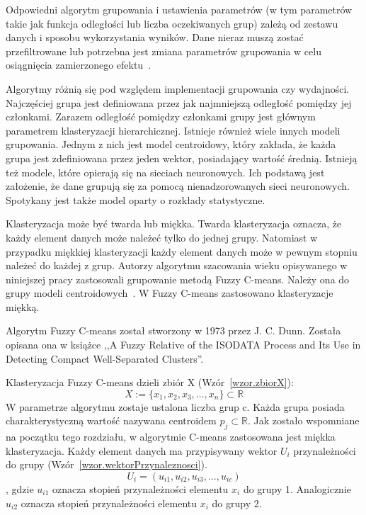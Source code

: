\documentclass[a4paper,twoside,12pt]{book}
\begin{document}
    Odpowiedni algorytm grupowania i ustawienia parametrów (w tym parametrów
    takie jak funkcja odległości lub liczba oczekiwanych grup)
    zależą od zestawu danych i sposobu wykorzystania wyników.
    Dane nieraz muszą zostać przefiltrowane lub potrzebna jest zmiana parametrów grupowania w celu osiągnięcia
    zamierzonego efektu~\cite{clusterWstep}.

    Algorytmy różnią się pod względem implementacji grupowania czy wydajności.
    Najczęściej grupa jest definiowana przez jak najmniejszą odległość pomiędzy jej członkami.
    Zarazem odległość pomiędzy członkami grupy jest głównym parametrem klasteryzacji hierarchicznej.
    Istnieje również wiele innych modeli grupowania.
    Jednym z nich jest model centroidowy,
    który zakłada, że każda grupa jest zdefiniowana przez jeden wektor, posiadający wartość średnią.
    Istnieją też modele, które opierają się na sieciach neuronowych.
    Ich podstawą jest założenie, że dane grupują się za pomocą nienadzorowanych sieci neuronowych.
    Spotykany jest także model oparty o rozkłady statystyczne.

    Klasteryzacja może być twarda lub miękka.
    Twarda klasteryzacja oznacza, że każdy element danych może należeć tylko do jednej grupy.
    Natomiast w przypadku miękkiej klasteryzacji każdy element danych może w pewnym stopniu należeć do każdej z grup.
    Autorzy algorytmu szacowania wieku opisywanego w niniejszej pracy zastosowali grupowanie metodą Fuzzy C-means.
    Należy ona do grupy modeli centroidowych~\cite{clusterWstep}. W Fuzzy C-means zastosowano klasteryzacje miękką.

    Algorytm Fuzzy C-means został stworzony w 1973 przez J. C. Dunn. Została opisana ona w książce
    ,,A Fuzzy Relative of the ISODATA Process and Its Use in Detecting Compact Well-Separated Clusters''.

    Klasteryzacja Fuzzy C-means dzieli zbiór X (Wzór~\ref{wzor.zbiorX}):
    \large
    \begin{equation}
        X:=\{x_{1},x_{2},x_{3},\ldots,x_{n}\}\subset \mathbb{R}
        \label{wzor.zbiorX}
    \end{equation}
    \normalsize
    W parametrze algorytmu zostaje ustalona liczba grup c.
    Każda grupa posiada charakterystyczną wartość nazywana centroidem $p_{j}\subset \mathbb{R}$.
    Jak zostało wspomniane na początku tego rozdziału, w algorytmie C-means zastosowana jest miękka klasteryzacja.
    Każdy element danych ma przypisywany wektor $U_{i}$ przynależności do grupy (Wzór~\ref{wzor.wektorPrzynaleznosci}).
    \large
    \begin{equation}
        U_{i}=(u_{i1}, u_{i2}, u_{i3}, \ldots, u_{ic})
        \label{wzor.wektorPrzynaleznosci}
    \end{equation}
    \normalsize
    , gdzie $u_{i1}$ oznacza stopień przynależności elementu $x_{i}$ do grupy 1.
    Analogicznie $u_{i2}$ oznacza stopień przynależności elementu $x_{i}$ do grupy 2.
\end{document}
